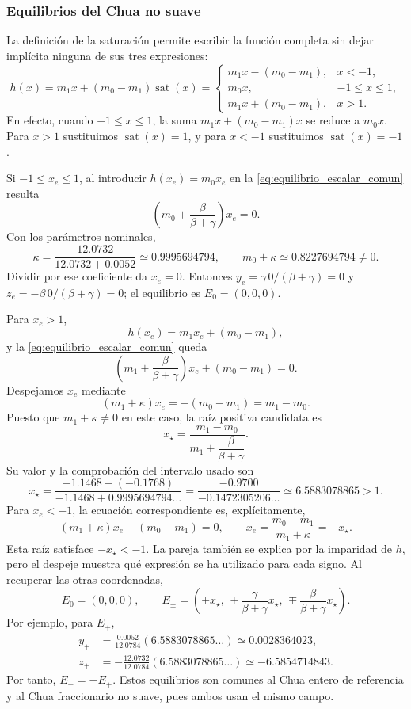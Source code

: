 \subsubsection{Equilibrios del Chua no suave}

La definición de la saturación permite escribir la función completa sin
dejar implícita ninguna de sus tres expresiones:
\[
h(x)=m_1x+(m_0-m_1)\operatorname{sat}(x)
=\begin{cases}
m_1x-(m_0-m_1),&x<-1,\\
m_0x,&-1\leq x\leq1,\\
m_1x+(m_0-m_1),&x>1.
\end{cases}
\]
En efecto, cuando \(-1\leq x\leq1\), la suma
\(m_1x+(m_0-m_1)x\) se reduce a \(m_0x\). Para \(x>1\) sustituimos
\(\operatorname{sat}(x)=1\), y para \(x<-1\) sustituimos
\(\operatorname{sat}(x)=-1\).

Si \(-1\leq x_e\leq1\), al introducir \(h(x_e)=m_0x_e\) en
la \cref{eq:equilibrio_escalar_comun} resulta
\begin{equation}
\left(m_0+\frac{\beta}{\beta+\gamma}\right)x_e=0.
\label{eq:equilibrio_interior_ns}
\end{equation}
Con los parámetros nominales,
\[
\kappa=\frac{12.0732}{12.0732+0.0052}
\simeq0.9995694794,
\qquad m_0+\kappa\simeq0.8227694794\neq0.
\]
Dividir por ese coeficiente da \(x_e=0\). Entonces
\(y_e=\gamma\,0/(\beta+\gamma)=0\) y
\(z_e=-\beta\,0/(\beta+\gamma)=0\); el equilibrio es \(E_0=(0,0,0)\).

Para \(x_e>1\),
\[
h(x_e)=m_1x_e+(m_0-m_1),
\]
y la \cref{eq:equilibrio_escalar_comun} queda
\[
\left(m_1+\frac{\beta}{\beta+\gamma}\right)x_e+(m_0-m_1)=0.
\]
Despejamos \(x_e\) mediante
\[
(m_1+\kappa)x_e=-(m_0-m_1)=m_1-m_0.
\]
Puesto que \(m_1+\kappa\neq0\) en este caso, la raíz positiva candidata es
\begin{equation}
x_\star=
\frac{m_1-m_0}
{m_1+\dfrac{\beta}{\beta+\gamma}}.
\label{eq:raiz_exterior_ns}
\end{equation}
Su valor y la comprobación del intervalo usado son
\[
x_\star=
\frac{-1.1468-(-0.1768)}{-1.1468+0.9995694794\ldots}
=\frac{-0.9700}{-0.1472305206\ldots}
\simeq6.5883078865>1.
\]
Para \(x_e<-1\), la ecuación correspondiente es, explícitamente,
\[
(m_1+\kappa)x_e-(m_0-m_1)=0,
\qquad
x_e=\frac{m_0-m_1}{m_1+\kappa}=-x_\star.
\]
Esta raíz satisface \(-x_\star<-1\). La pareja también se explica por la
imparidad de \(h\), pero el despeje muestra qué expresión se ha utilizado
para cada signo. Al recuperar las otras coordenadas,
\begin{equation}
E_0=(0,0,0),\qquad
E_\pm=
\left(
\pm x_\star,\,
\pm\frac{\gamma}{\beta+\gamma}x_\star,\,
\mp\frac{\beta}{\beta+\gamma}x_\star
\right).
\label{eq:equilibrios_ns_simbolicos}
\end{equation}
Por ejemplo, para \(E_+\),
\begin{align*}
y_+&=\frac{0.0052}{12.0784}(6.5883078865\ldots)
     \simeq0.0028364023,\\
z_+&=-\frac{12.0732}{12.0784}(6.5883078865\ldots)
     \simeq-6.5854714843.
\end{align*}
Por tanto, \(E_-=-E_+\). Estos equilibrios son comunes al Chua entero de
referencia y al Chua fraccionario no suave, pues ambos usan el mismo campo.

